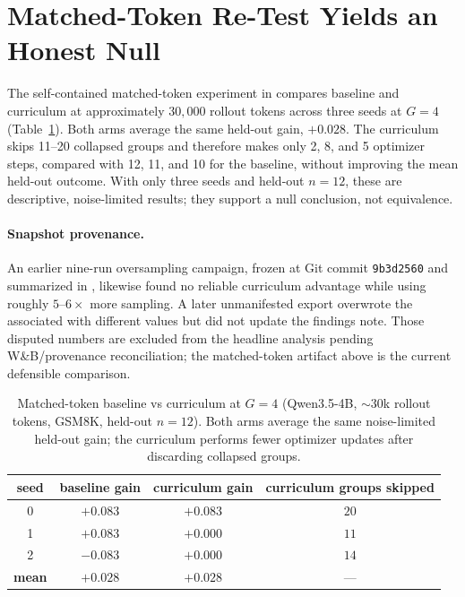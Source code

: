 \documentclass[12pt,a4paper]{report}
\begin{document}
\section{Matched-Token Re-Test Yields an Honest Null}
\label{sec:campaign}
The self-contained matched-token experiment in
 compares baseline and
curriculum at approximately $30{,}000$ rollout tokens across three seeds at $G{=}4$
(Table~\ref{tab:campaign}). Both arms average the same held-out gain, $+0.028$.
The curriculum skips 11--20 collapsed groups and therefore makes only 2, 8, and 5
optimizer steps, compared with 12, 11, and 10 for the baseline, without improving
the mean held-out outcome. With only three seeds and held-out $n=12$, these are
descriptive, noise-limited results; they support a null conclusion, not equivalence.

\paragraph{Snapshot provenance.} An earlier nine-run oversampling campaign, frozen
at Git commit \texttt{9b3d2560} and summarized in
, likewise found no reliable
curriculum advantage while using roughly $5$--$6\times$ more sampling. A later
unmanifested export overwrote the associated  with different
values but did not update the findings note. Those disputed numbers are excluded
from the headline analysis pending W\&B/provenance reconciliation; the matched-token
artifact above is the current defensible comparison.

\begin{table}[t]
\centering
\small
\begin{tabular}{@{}cccc@{}}
\toprule
seed & baseline gain & curriculum gain & curriculum groups skipped \\
\midrule
0 & $+0.083$ & $+0.083$ & $20$ \\
1 & $+0.083$ & $+0.000$ & $11$ \\
2 & $-0.083$ & $+0.000$ & $14$ \\
\midrule
\textbf{mean} & $\mathbf{+0.028}$ & $\mathbf{+0.028}$ & --- \\
\bottomrule
\end{tabular}
\caption{Matched-token baseline vs curriculum at $G{=}4$ (Qwen3.5-4B,
${\sim}30$k rollout tokens, GSM8K, held-out $n=12$). Both arms average the same
noise-limited held-out gain; the curriculum performs fewer optimizer updates after
discarding collapsed groups.}
\label{tab:campaign}
\end{table}
\end{document}
